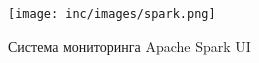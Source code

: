\begin{figure}[ht!]
    \centering
    \texttt{[image: inc/images/spark.png]}
    \caption{Система мониторинга Apache Spark UI}\label{img:spark}
\end{figure}